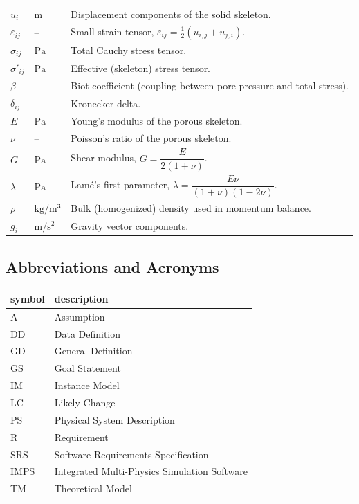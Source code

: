 \documentclass[12pt]{article}
\newcommand{\progname}{IMPS}
\begin{document}
\begin{longtable}{p{2.5cm} p{3.0cm} p{9.0cm}}
$u_i$ & $\mathrm{m}$ & Displacement components of the solid skeleton.\\
$\varepsilon_{ij}$ & -- & Small-strain tensor, $\varepsilon_{ij}=\tfrac{1}{2}(u_{i,j}+u_{j,i})$.\\
$\sigma_{ij}$ & $\mathrm{Pa}$ & Total Cauchy stress tensor.\\
$\sigma'_{ij}$ & $\mathrm{Pa}$ & Effective (skeleton) stress tensor.\\
$\beta$ & -- & Biot coefficient (coupling between pore pressure and total stress).\\
$\delta_{ij}$ & -- & Kronecker delta.\\
$E$ & $\mathrm{Pa}$ & Young’s modulus of the porous skeleton.\\
$\nu$ & -- & Poisson’s ratio of the porous skeleton.\\
$G$ & $\mathrm{Pa}$ & Shear modulus, $G=\dfrac{E}{2(1+\nu)}$.\\
$\lambda$ & $\mathrm{Pa}$ & Lam\'e’s first parameter, $\lambda=\dfrac{E\nu}{(1+\nu)(1-2\nu)}$.\\
$\rho$ & $\mathrm{kg/m^3}$ & Bulk (homogenized) density used in momentum balance.\\
$g_i$ & $\mathrm{m/s^2}$ & Gravity vector components.\\

\end{longtable}



\subsection{Abbreviations and Acronyms}

\renewcommand{\arraystretch}{1.2}
\begin{tabular}{l l}
  \toprule
  \textbf{symbol} & \textbf{description}\\
  \midrule
  A & Assumption\\
  DD & Data Definition\\
  GD & General Definition\\
  GS & Goal Statement\\
  IM & Instance Model\\
  LC & Likely Change\\
  PS & Physical System Description\\
  R & Requirement\\
  SRS & Software Requirements Specification\\
  \progname & Integrated Multi-Physics Simulation Software\\
  TM & Theoretical Model\\
  \bottomrule
\end{tabular}
\end{document}
